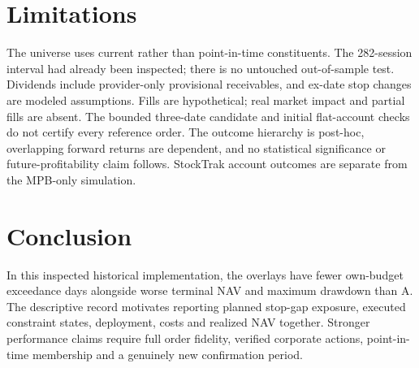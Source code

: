\documentclass[11pt]{article}
\begin{document}
\section{Limitations}
The universe uses current rather than point-in-time constituents. The 282-session interval had already been inspected; there is no untouched out-of-sample test. Dividends include provider-only provisional receivables, and ex-date stop changes are modeled assumptions. Fills are hypothetical; real market impact and partial fills are absent. The bounded three-date candidate and initial flat-account checks do not certify every reference order. The outcome hierarchy is post-hoc, overlapping forward returns are dependent, and no statistical significance or future-profitability claim follows. StockTrak account outcomes are separate from the MPB-only simulation.

\section{Conclusion}
In this inspected historical implementation, the overlays have fewer own-budget exceedance days alongside worse terminal NAV and maximum drawdown than A. The descriptive record motivates reporting planned stop-gap exposure, executed constraint states, deployment, costs and realized NAV together. Stronger performance claims require full order fidelity, verified corporate actions, point-in-time membership and a genuinely new confirmation period.



\end{document}

